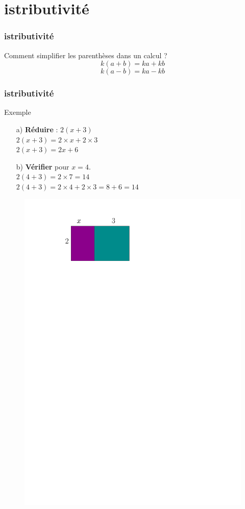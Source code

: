 \documentclass{beamer}
\begin{document}
\section{ istributivité}

\begin{frame}
  \frametitle{ istributivité}
  \begin{alertblock}{Comment simplifier les parenthèses dans un calcul ?}
    $$k (a + b) = ka + kb$$
    $$k (a - b) = ka - kb$$ 
  \end{alertblock}
\end{frame}

\begin{frame}
  \frametitle{ istributivité}

  \begin{exampleblock}{Exemple}
    \begin{enumerate}
    \item[a)] \textbf{Réduire} : $2(x + 3)$\\
      $ 2(x + 3) = 2 \times x + 2 \times 3$ \\
      $ 2(x + 3) = 2x + 6$\\

    \item[b)] \textbf{Vérifier} pour $x= 4$.\\
      $ 2(4 + 3) = 2 \times 7 = 14$\\
      $ 2(4 + 3) = 2 \times 4 + 2 \times 3 = 8 + 6 = 14$\\
    \end{enumerate}
  \end{exampleblock}

  \begin{figure}[H]
    \centering
    \includegraphics[width=0.6\linewidth]{sources/1/simple-distri.pdf}
  \end{figure}
\end{frame}
\end{document}
